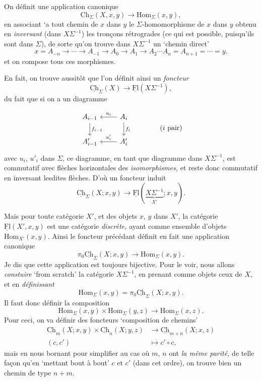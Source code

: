 \documentclass[11pt]{article}
\newcommand{\printedpage}[1]{\marginpar{\footnotesize p.~#1}}
\newcommand{\msp}[1]{\marginpar{\footnotesize [#1]}}
\newcommand{\Hom}{\mathrm{Hom}}
\newcommand{\uCh}{\underline{\mathrm{Ch}}}
\newcommand{\uFl}{\underline{\mathrm{Fl}}}
\begin{document}
On définit une application canonique
\[
\mathrm{Ch}_\Sigma(X,x,y)\longrightarrow\Hom_\Sigma(x,y),
\]
\msp{page 7}
en associant `a tout chemin de $x$ dans $y$ le $\Sigma$-homomorphisme de $x$ dans $y$ obtenu en \textit{inversant} (dans $X\Sigma^{-1}$) les tronçons rétrogrades (ce qui est possible, puisqu'ils sont dans $\Sigma$), de sorte qu'on trouve dans $X\Sigma^{-1}$ un `chemin direct' %
\[
x=A_{-n}\longrightarrow\cdots\longrightarrow A_{-1}\longrightarrow A_0\longrightarrow A_1\longrightarrow A_2\cdots A_n=A_{n+1}=\cdots=y.
\]
et on compose tous ces morphismes.

En fait, on trouve aussitôt que l'on définit ainsi un \textit{foncteur}
\[
\uCh_\Sigma(X)\longrightarrow\uFl(X\Sigma^{-1}),
\]
 du fait que si on a un diagramme

\printedpage{6}
\[
\begin{tikzcd}
A_{i-1} \arrow[d, "f_{i-1}"] & A_i \arrow[l, "u_i"'] \arrow[d, "f_i"] \\
A'_{i-1} & A'_i \arrow[l, "u'_i"']
\end{tikzcd}
\qquad\qquad (i\text{ pair})
\]
avec $u_i$, $u'_i$ dans $\Sigma$, ce diagramme, en tant que diagramme dans $X\Sigma^{-1}$, est commutatif avec flèches horizontales des \textit{isomorphismes,} et reste donc commutatif en inversant lesdites flèches. D'où un foncteur induit
\[
\uCh_\Sigma(X;x,y)\longrightarrow\uFl(\underbrace{X\Sigma^{-1}}_{X'};x,y).
\]

Mais pour toute catégorie $X'$, et des objets $x$, $y$ dans $X'$, la catégorie $\uFl(X',x,y)$ est
\msp{page 8}
une catégorie \textit{discrète,} ayant comme ensemble d'objets $\Hom_{X'}(x,y)$. Ainsi le foncteur précédant définit en fait une application canonique %
\[
\boxed{\pi_0\uCh_\Sigma(X;x,y)\longrightarrow\Hom_\Sigma(x,y).}
\]
Je dis que cette application est toujours bijective. Pour le voir, nous allons \textit{constuire} `from scratch' la catégorie $X\Sigma^{-1}$, en prenant comme objets ceux de $X$, et en \textit{définissant} %
\[
\boxed{\Hom_\Sigma(x,y)=\pi_0\uCh_\Sigma(X;x,y).}
\]
Il faut donc définir la composition
\[
\Hom_\Sigma(x,y)\times\Hom_\Sigma(y,z)\longrightarrow\Hom_\Sigma(x,z).
\]
Pour ceci, on va définir des foncteurs `composition de chemins'
\[
\begin{aligned}
\uCh_m(X;x,y)\times\uCh_n(X;y,z) &\longrightarrow \uCh_{m+n}(X;x,z)\\
(c,c') &\longmapsto c'\circ c,
\end{aligned}
\]
mais en nous bornant pour simplifier au cas où $m$, $n$ ont \textit{la même parité,} de telle façon qu'en `mettant bout à bout' $c$ et $c'$ (dans cet ordre), on trouve bien un chemin de type $n+m$.
\end{document}
